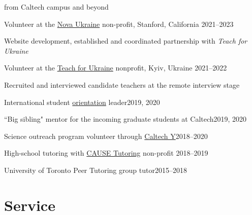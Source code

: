 \documentclass[margin,line]{res}
\newenvironment{list1}{
  \begin{list}{\ding{113}}{%
      \setlength{\itemsep}{0in}
      \setlength{\parsep}{0in} \setlength{\parskip}{0in}
      \setlength{\topsep}{0in} \setlength{\partopsep}{0in} 
      \setlength{\leftmargin}{0.17in}}}{\end{list}}
\begin{document}
\begin{resume}
\begin{list1}
\item[]from Caltech campus and beyond
\end{list1}

\vspace*{-2.5mm}

Volunteer at the \href{https://novaukraine.org/}{Nova Ukraine} non-profit, Stanford, California \hfill{2021--2023}

\begin{list1}
\item[]Website development, established and coordinated partnership with {\em Teach for Ukraine}
\end{list1}

\vspace{-0.3cm}

Volunteer at the \href{https://teachforukraine.org/en/}{Teach for Ukraine} nonprofit, Kyiv, Ukraine \hfill{2021--2022}

\begin{list1}
\item[]Recruited and interviewed candidate teachers at the remote interview stage
\end{list1}

\vspace{-0.3cm}

International student \href{https://international.caltech.edu/Orientation/isp}{orientation} leader\hfill{2019, 2020}

\vspace{-0.3cm}

``Big sibling" mentor for the incoming graduate students at Caltech\hfill{2019, 2020}

\vspace{-0.3cm}

Science outreach program volunteer through \href{https://www.caltechy.org/student-opportunities}{Caltech Y}\hfill{2018--2020}

\vspace{-0.3cm}

High-school tutoring with \href{https://www.facebook.com/CauseTutoring/?locale=zh_CN&paipv=0&eav=AfapFTOSVzUFy0ircWljNcf8AswCiGwIsBsPs-au8kmxfK99t_d4mxVNzcEVvxME7Jw&_rdr}{CAUSE Tutoring} non-profit \hfill{2018--2019}

\vspace{-0.3cm}

University of Toronto Peer Tutoring group tutor\hfill{2015--2018}

\section{\sc Service}


\end{resume}
\end{document}
